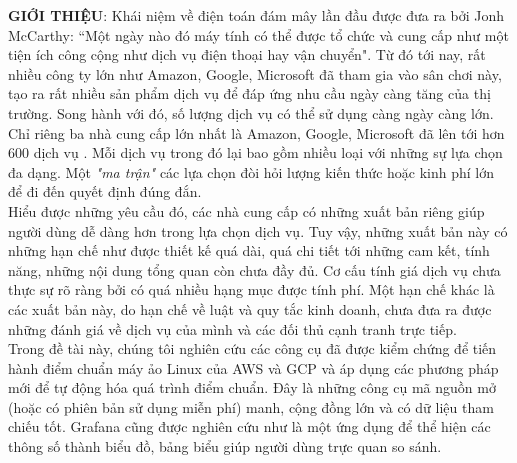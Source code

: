 \documentclass{article}
\begin{document}
\textbf{GIỚI THIỆU}: Khái niệm về điện toán đám mây lần đầu được đưa ra bởi Jonh McCarthy: “Một ngày nào đó máy tính có thể được tổ chức và cung cấp như một tiện ích công cộng như dịch vụ điện thoại hay vận chuyển"\cite{garfinkel1999architects}. Từ đó tới nay, rất nhiều công ty lớn như Amazon, Google, Microsoft đã tham gia vào sân chơi này, tạo ra rất nhiều sản phẩm dịch vụ để đáp ứng nhu cầu ngày càng tăng của thị trường. Song hành với đó, số lượng dịch vụ có thể sử dụng càng ngày càng lớn. Chỉ riêng ba nhà cung cấp lớn nhất là Amazon, Google, Microsoft đã lên tới hơn 600 dịch vụ . Mỗi dịch vụ trong đó lại bao gồm nhiều loại với những sự lựa chọn đa dạng. Một \textit{"ma trận"} các lựa chọn đòi hỏi lượng kiến thức hoặc kinh phí lớn để đi đến quyết định đúng đắn.\\

Hiểu được những yêu cầu đó, các nhà cung cấp có những xuất bản riêng \cite{geewax2018google, wittig2018amazon} giúp người dùng dễ dàng hơn trong lựa chọn dịch vụ. Tuy vậy, những xuất bản này có những hạn chế như được thiết kế quá dài, quá chi tiết tới những cam kết, tính năng, những nội dung tổng quan còn chưa đầy đủ. Cơ cấu tính giá dịch vụ chưa thực sự rõ ràng bởi có quá nhiều hạng mục được tính phí. Một hạn chế khác là các xuất bản này, do hạn chế về luật và quy tắc kinh doanh, chưa đưa ra được những đánh giá về dịch vụ của mình và các đối thủ cạnh tranh trực tiếp. \\

Trong đề tài này, chúng tôi nghiên cứu các công cụ đã được kiểm chứng\cite*{Passmark2023Performancetest, Axboe2023fio, Iozone2016Benchmark, OOKLA2023Speedtest} để tiến hành điểm chuẩn máy ảo Linux của AWS và GCP và áp dụng các phương pháp mới để tự động hóa quá trình điểm chuẩn. Đây là những công cụ mã nguồn mở (hoặc có phiên bản sử dụng miễn phí) manh, cộng đồng lớn và có dữ liệu tham chiếu tốt. Grafana\cite{chakraborty2021grafana} cũng được nghiên cứu như là một ứng dụng để thể hiện các thông số thành biểu đồ, bảng biểu giúp người dùng trực quan so sánh. \\
\end{document}
